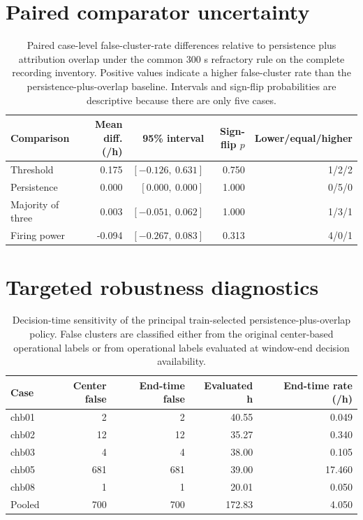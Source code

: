 \documentclass[11pt,a4paper]{article}
\begin{document}
\section{Paired comparator uncertainty}
\begin{table}[H]
\centering
\caption{Paired case-level false-cluster-rate differences relative to persistence plus attribution overlap under the common 300 s refractory rule on the complete recording inventory. Positive values indicate a higher false-cluster rate than the persistence-plus-overlap baseline. Intervals and sign-flip probabilities are descriptive because there are only five cases.}
\label{tab:comparator_paired}
\scriptsize
\setlength{\tabcolsep}{4pt}
\begin{tabular}{@{}lrrrr@{}}
\toprule
Comparison & Mean diff. (/h) & 95\% interval & Sign-flip $p$ & Lower/equal/higher \\
\midrule
Threshold & 0.175 & $[-0.126,\ 0.631]$ & 0.750 & 1/2/2 \\
Persistence & 0.000 & $[0.000,\ 0.000]$ & 1.000 & 0/5/0 \\
Majority of three & 0.003 & $[-0.051,\ 0.062]$ & 1.000 & 1/3/1 \\
Firing power & -0.094 & $[-0.267,\ 0.083]$ & 0.313 & 4/0/1 \\
\bottomrule
\end{tabular}
\end{table}

\section{Targeted robustness diagnostics}
\begin{table}[H]
\centering
\caption{Decision-time sensitivity of the principal train-selected persistence-plus-overlap policy. False clusters are classified either from the original center-based operational labels or from operational labels evaluated at window-end decision availability.}
\label{tab:decision_time_sensitivity}
\scriptsize
\setlength{\tabcolsep}{5pt}
\begin{tabular}{@{}lrrrr@{}}
\toprule
Case & Center false & End-time false & Evaluated h & End-time rate (/h) \\
\midrule
chb01 & 2 & 2 & 40.55 & 0.049 \\
chb02 & 12 & 12 & 35.27 & 0.340 \\
chb03 & 4 & 4 & 38.00 & 0.105 \\
chb05 & 681 & 681 & 39.00 & 17.460 \\
chb08 & 1 & 1 & 20.01 & 0.050 \\
\midrule
Pooled & 700 & 700 & 172.83 & 4.050 \\
\bottomrule
\end{tabular}
\end{table}
\end{document}
